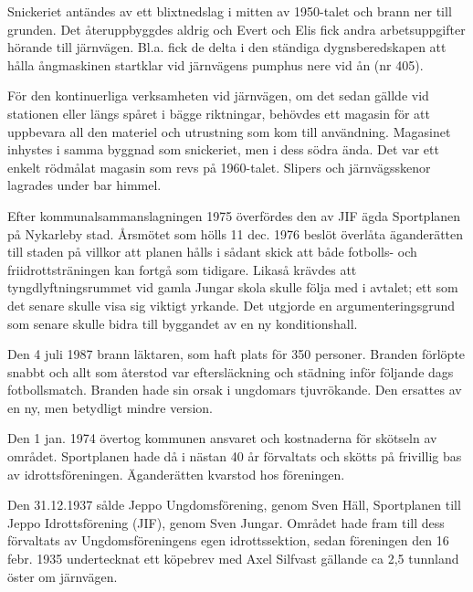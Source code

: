 Snickeriet antändes av ett blixtnedslag i mitten av 1950-talet och brann ner till grunden. Det återuppbyggdes aldrig och Evert och Elis fick andra arbetsuppgifter hörande till järnvägen. Bl.a. fick de delta i den ständiga dygnsberedskapen att hålla ångmaskinen startklar vid järnvägens pumphus nere vid ån (nr 405).





För den kontinuerliga verksamheten vid järnvägen, om det sedan gällde vid stationen eller längs spåret i bägge riktningar, behövdes ett magasin för att uppbevara all den materiel och utrustning som kom till användning. Magasinet inhystes i samma byggnad som snickeriet, men i dess södra ända. Det var ett enkelt rödmålat magasin som revs på 1960-talet. Slipers och järnvägsskenor lagrades under bar himmel.






Efter kommunalsammanslagningen 1975 överfördes den av JIF ägda Sportplanen på Nykarleby stad. Årsmötet som hölls 11 dec. 1976 beslöt överlåta äganderätten till staden på villkor att planen hålls i sådant skick  att både fotbolls- och friidrottsträningen kan fortgå som tidigare. Likaså krävdes att tyngdlyftningsrummet vid gamla Jungar skola skulle följa med i avtalet; ett som det senare skulle visa sig viktigt yrkande. Det utgjorde en argumenteringsgrund som senare skulle bidra till byggandet av en ny konditionshall.

Den 4 juli 1987 brann läktaren, som  haft plats för 350 personer. Branden förlöpte snabbt och allt som återstod var eftersläckning och städning inför följande dags fotbollsmatch. Branden hade sin orsak i ungdomars tjuvrökande. Den ersattes av en ny, men betydligt mindre version.


Den 1 jan. 1974 övertog kommunen ansvaret och kostnaderna för skötseln av området. Sportplanen hade då i nästan 40 år förvaltats och skötts på frivillig bas av idrottsföreningen. Äganderätten kvarstod hos föreningen.\jhvspace{}


Den 31.12.1937 sålde Jeppo Ungdomsförening, genom Sven Häll, Sportplanen till Jeppo Idrottsförening (JIF), genom Sven Jungar. Området hade fram till dess förvaltats av Ungdomsföreningens egen idrottssektion, sedan föreningen den 16 febr. 1935 undertecknat ett köpebrev med Axel Silfvast gällande ca 2,5 tunnland öster om järnvägen.

